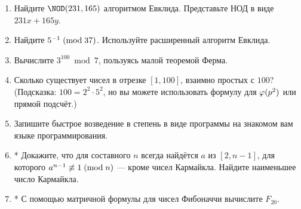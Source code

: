 \begin{tasksbox}
\begin{enumerate}
  \item Найдите $\NOD(231, 165)$ алгоритмом Евклида. Представьте НОД в виде $231 x + 165 y$.
  \item Найдите $5^{-1} \;(\mathrm{mod}\;37)$. Используйте расширенный алгоритм Евклида.
  \item Вычислите $3^{100} \bmod 7$, пользуясь малой теоремой Ферма.
  \item Сколько существует чисел в отрезке $[1, 100]$, взаимно простых с $100$? (Подсказка: $100 = 2^2\cdot 5^2$, но вы можете использовать формулу для $\varphi(p^2)$ или прямой подсчёт.)
  \item Запишите быстрое возведение в степень в виде программы на знакомом вам языке программирования.
  \item* Докажите, что для составного $n$ всегда найдётся $a$ из $[2, n-1]$, для которого $a^{n-1} \not\equiv 1 \;(\mathrm{mod}\;n)$ --- кроме чисел Кармайкла. Найдите наименьшее число Кармайкла.
  \item* С помощью матричной формулы для чисел Фибоначчи вычислите $F_{20}$.
\end{enumerate}
\end{tasksbox}
